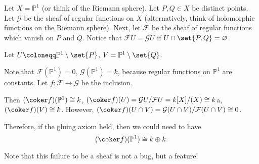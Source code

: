 Let $X = \mathbb{P}^1$ (or think of the Riemann sphere). Let $P, Q \in X$ be distinct
points. Let $\mathcal{G}$ be the sheaf of regular functions on $X$ (alternatively, think
of holomorphic functions on the Riemann sphere). Next, let $\mathcal{F}$ be the sheaf
of regular functions which vanish on $P$ and $Q$. Notice that
$\mathcal{F}U = \mathcal{G}U$ if $U\cap \set{P, Q} = \varnothing$.

Let $U \coloneqq \mathbb{P}^1\setminus\set{P}$, $V = \mathbb{P}^1\setminus\set{Q}$.

Note that $\mathcal{F}(\mathbb{P}^1) = 0$, $\mathcal{G}(\mathbb{P}^1) = k$,
because regular functions on $\mathbb{P}^1$ are constants. Let
$f\colon \mathcal{F}\to \mathcal{G}$ be the inclusion.

Then $(\coker f)(\mathbb{P}^1) \cong k$, $(\coker f)(U) = \mathcal{G}U/\mathcal{F}U = k[X]/(X) \cong k$a,
$(\coker f)(V) \cong k$. However, $(\coker f)(U\cap V) = \mathcal{G}(U\cap V)/\mathcal{F}(U\cap V) \cong 0$.

Therefore, if the gluing axiom held, then we could need to have
\[ (\coker f)(\mathbb{P}^1) \cong k\oplus k. \]

Note that this failure to be a sheaf is not a bug, but a feature!
